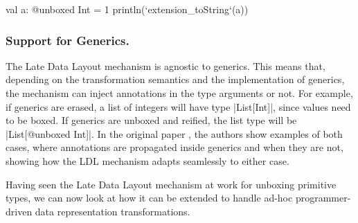 \begin{lstlisting-nobreak}
val a: @unboxed Int = 1
println(`extension_toString`(a))
\end{lstlisting-nobreak}

\subsubsection{Support for Generics.} The Late Data Layout mechanism is agnostic to generics. This means that, depending on the transformation semantics and the implementation of generics, the mechanism can inject annotations in the type arguments or not. For example, if generics are erased, a list of integers will have type |List[Int]|, since values need to be boxed. If generics are unboxed and reified, the list type will be |List[@unboxed Int]|. In the original paper \cite{ldl}, the authors show examples of both cases, where annotations are propagated inside generics and when they are not, showing how the LDL mechanism adapts seamlessly to either case.

Having seen the Late Data Layout mechanism at work for unboxing primitive types, we can now look at how it can be extended to handle ad-hoc programmer-driven data representation transformations.